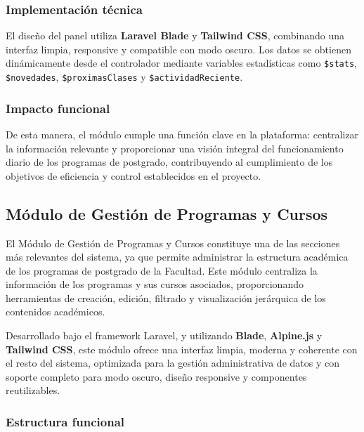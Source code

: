 \subsubsection{Implementación técnica}

El diseño del panel utiliza \textbf{Laravel Blade} y \textbf{Tailwind CSS}, combinando una interfaz limpia, responsive y compatible con modo oscuro. Los datos se obtienen dinámicamente desde el controlador mediante variables estadísticas como \texttt{\$stats}, \texttt{\$novedades}, \texttt{\$proximasClases} y \texttt{\$actividadReciente}.

\subsubsection{Impacto funcional}

De esta manera, el módulo cumple una función clave en la plataforma: centralizar la información relevante y proporcionar una visión integral del funcionamiento diario de los programas de postgrado, contribuyendo al cumplimiento de los objetivos de eficiencia y control establecidos en el proyecto.

\subsection{Módulo de Gestión de Programas y Cursos}

El Módulo de Gestión de Programas y Cursos constituye una de las secciones más relevantes del sistema, ya que permite administrar la estructura académica de los programas de postgrado de la Facultad. Este módulo centraliza la información de los programas y sus cursos asociados, proporcionando herramientas de creación, edición, filtrado y visualización jerárquica de los contenidos académicos.

Desarrollado bajo el framework Laravel, y utilizando \textbf{Blade}, \textbf{Alpine.js} y \textbf{Tailwind CSS}, este módulo ofrece una interfaz limpia, moderna y coherente con el resto del sistema, optimizada para la gestión administrativa de datos y con soporte completo para modo oscuro, diseño responsive y componentes reutilizables.

\subsubsection{Estructura funcional}


